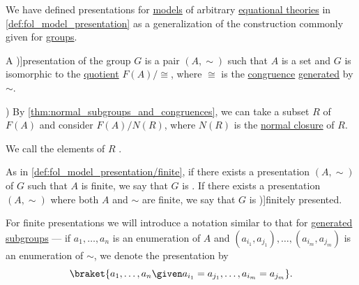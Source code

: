 \begin{definition}\label{def:group_presentation}\mimprovised
  We have defined presentations for \hyperref[def:fol_theory/model]{models} of arbitrary \hyperref[def:fol_equational_theory]{equational theories} in \cref{def:fol_model_presentation} as a generalization of the construction commonly given for \hyperref[def:group]{groups}.

  A \term[en=presentations (\cite[90]{Bourbaki1998Algebra1to3})]{presentation} of the group \( G \) is a pair \( (A, {\sim}) \) such that \( A \) is a set and \( G \) is isomorphic to the \hyperref[def:group/quotient]{quotient} \( F(A) / {\cong} \), where \( {\cong} \) is the \hyperref[def:fol_congruence]{congruence} \hyperref[def:fol_generated_congruence]{generated} by \( {\sim} \).

  \begin{thmenum}
    ) By \cref{thm:normal_subgroups_and_congruences}, we can take a subset \( R \) of \( F(A) \) and consider \( F(A) / N(R) \), where \( N(R) \) is the \hyperref[def:normal_closure]{normal closure} of \( R \).

    We call the elements of \( R \) .

     As in \cref{def:fol_model_presentation/finite}, if there exists a presentation \( (A, {\sim}) \) of \( G \) such that \( A \) is finite, we say that \( G \) is \term. If there exists a presentation \( (A, \sim) \) where both \( A \) and \( {\sim} \) are finite, we say that \( G \) is \term[ru=конечно определённая группа (\cite[43]{Кострикин2020АлгебраЧасть3})]{finitely presented}.

    For finite presentations we will introduce a notation similar to that for \hyperref[def:group/generated]{generated subgroups} --- if \( a_1, \ldots, a_n \) is an enumeration of \( A \) and \( (a_{i_1}, a_{j_1}), \ldots, (a_{i_m}, a_{j_m}) \) is an enumeration of \( {\sim} \), we denote the presentation by
    \begin{equation}\label{eq:def:group_presentation/finite}
      \braket{ a_1, \ldots, a_n \given a_{i_1} = a_{j_1}, \ldots, a_{i_m} = a_{j_m} }.
    \end{equation}
  \end{thmenum}
\end{definition}

